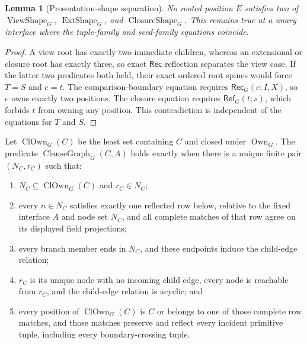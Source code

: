 \documentclass[11pt,twoside]{article}
\newcommand{\Rec}{\mathsf{Rec}}
\newcommand{\RefPos}{\mathsf{Ref}}
\newtheorem{lemma}[theorem]{Lemma}
\begin{document}
\begin{lemma}[Presentation-shape separation]\label{lem:presentation-separation}
No rooted position \(E\) satisfies two of
\(\operatorname{ViewShape}_G\), \(\operatorname{ExtShape}_G\), and
\(\operatorname{ClosureShape}_G\).  This remains true at a unary interface where
the tuple-family and seed-family equations coincide.
\end{lemma}

\begin{proof}
A view root has exactly two immediate children, whereas an extensional or closure
root has exactly three, so exact \(\Rec\) reflection separates the view case.
If the latter two predicates both held, their exact ordered root spines would
force \(T=S\) and \(e=t\).  The comparison-boundary equation requires
\(\Rec_G(e;I,X)\), so \(e\) owns exactly two positions.  The closure equation
requires \(\RefPos_G(t;s)\), which forbids \(t\) from owning any position.  This
contradiction is independent of the equations for \(T\) and \(S\).
\end{proof}

Let \(\operatorname{ClOwn}_G(C)\) be the least set containing \(C\) and closed
under \(\operatorname{Own}_G\).  The predicate
\(\operatorname{ClauseGraph}_G(C,A)\) holds exactly when there is a unique finite
pair \((N_C,r_C)\) such that:

\begin{enumerate}[leftmargin=2.2em]
  \item \(N_C\subseteq\operatorname{ClOwn}_G(C)\) and \(r_C\in N_C\);
  \item every \(n\in N_C\) satisfies exactly one reflected row below, relative
        to the fixed interface \(A\) and node set \(N_C\), and all complete
        matches of that row agree on its displayed field projections;
  \item every branch member ends in \(N_C\), and these endpoints induce the
        child-edge relation;
  \item \(r_C\) is its unique node with no incoming child edge, every node is
        reachable from \(r_C\), and the child-edge relation is acyclic; and
  \item every position of \(\operatorname{ClOwn}_G(C)\) is \(C\) or belongs to
        one of those complete row matches, and those matches preserve and reflect
        every incident primitive tuple, including every boundary-crossing tuple.
\end{enumerate}
\end{document}
